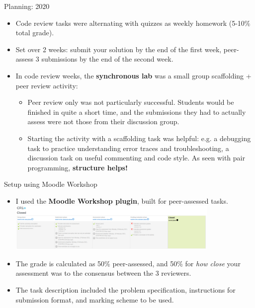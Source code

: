 \documentclass[aspectratio=169, 12pt]{beamer}
\begin{document}
\begin{frame}{Planning: 2020}
    \begin{itemize}
        \item<1-> Code review tasks were alternating with quizzes as weekly homework (5-10\% total grade).
        \item<2-> Set over 2 weeks: submit your solution by the end of the first week, peer-assess 3 submissions by the end of the second week.
        \item<3-> In code review weeks, the \textbf{synchronous lab} was a small group scaffolding + peer review activity:
            \begin{itemize}
                \item Peer review only was not particularly successful. Students would be finished in quite a short time, and the submissions they had to actually assess were not those from their discussion group.
                \item Starting the activity with a scaffolding task was helpful: e.g. a debugging task to practice understanding error traces and troubleshooting, a discussion task on useful commenting and code style. As seen with pair programming, \textbf{structure helps!}
            \end{itemize}
    \end{itemize}
\end{frame}

\begin{frame}{Setup using Moodle Workshop}
    \begin{itemize}
        \item<1-> I used the \textbf{Moodle Workshop plugin}, built for peer-assessed tasks.
            \includegraphics[width=0.8\textwidth]{graphics/workshop.png}
        \item<2-> The grade is calculated as 50\% peer-assessed, and 50\% for \textit{how close} your assessment was to the consensus between the 3 reviewers.
        \item<3-> The task description included the problem specification, instructions for submission format, and marking scheme to be used.
    \end{itemize}
\end{frame}
\end{document}
